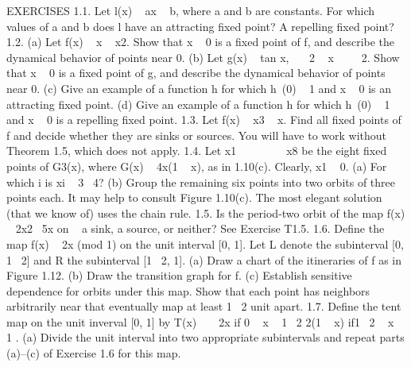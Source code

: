 \documentclass{article}
\begin{document}
EXERCISES
1.1. Let l(x)   ax   b, where a and b are constants. For which values of a and b does l
have an attracting fixed point? A repelling fixed point?
1.2. (a) Let f(x)   x   x2. Show that x   0 is a fixed point of f, and describe the
dynamical behavior of points near 0.
(b) Let g(x)   tan x,    2   x      2. Show that x   0 is a fixed point of g,
and describe the dynamical behavior of points near 0.
(c) Give an example of a function h for which h (0)   1 and x   0 is an
attracting fixed point.
(d) Give an example of a function h for which h (0)   1 and x   0 is a repelling
fixed point.
1.3. Let f(x)   x3   x. Find all fixed points of f and decide whether they are sinks or
sources. You will have to work without Theorem 1.5, which does not apply.
1.4. Let x1           x8 be the eight fixed points of G3(x), where G(x)   4x(1   x), as
in 1.10(c). Clearly, x1   0.
(a) For which i is xi   3  4?
(b) Group the remaining six points into two orbits of three points each. It may
help to consult Figure 1.10(c). The most elegant solution (that we know of) uses
the chain rule.
1.5. Is the period-two orbit of the map f(x)   2x2  5x on   a sink, a source, or neither?
See Exercise T1.5.
1.6. Define the map f(x)   2x (mod 1) on the unit interval [0, 1]. Let L denote the
subinterval [0, 1  2] and R the subinterval [1  2, 1].
(a) Draw a chart of the itineraries of f as in Figure 1.12.
(b) Draw the transition graph for f.
(c) Establish sensitive dependence for orbits under this map. Show that each
point has neighbors arbitrarily near that eventually map at least 1  2 unit apart.
1.7. Define the tent map on the unit inverval [0, 1] by
T(x)  
 
2x if 0   x   1  2
2(1   x) if1  2   x   1
.
(a) Divide the unit interval into two appropriate subintervals and repeat parts
(a)–(c) of Exercise 1.6 for this map.
\end{document}
